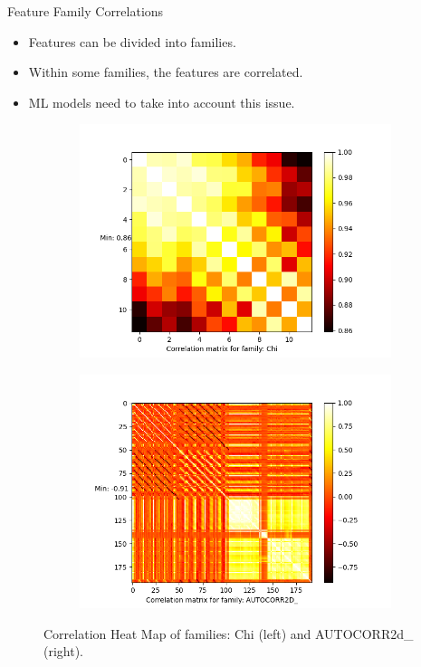 \documentclass{beamer}
\begin{document}
\begin{frame}[t]{Feature Family Correlations}
\begin{itemize}
\item Features can be divided into families.
\item Within some families, the features are correlated.
\item ML models need to take into account this issue.
\end{itemize}
\begin{figure}[htb]
    \begin{subfigure}[b]{0.49\textwidth}
         \centering
         \includegraphics[scale=0.25]{images/correlationChi}
        \label{fig:correlationChi}
     \end{subfigure}
     \hfill
    \begin{subfigure}[b]{0.49\textwidth}
         \centering
         \includegraphics[scale=0.25]{images/correlationAUTOCORR2D}
        \label{fig:correlationfr}
     \end{subfigure}
     \caption{Correlation Heat Map of families: Chi (left) and AUTOCORR2d\_ (right).}
     \label{fig:correlationheatmap}
\end{figure}
\end{frame}
\end{document}
